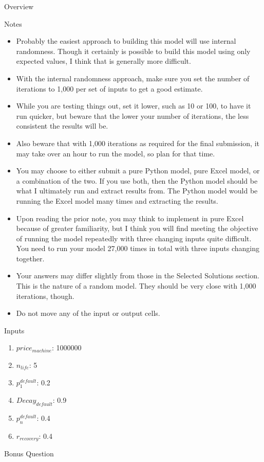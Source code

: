 \documentclass[]{article}
\begin{document}
\begin{section}{Overview}
\begin{subsection}{Notes}
\begin{itemize}
\item Probably the easiest approach to building this model will use internal randomness. Though it certainly is possible to build this model using only expected values, I think that is generally more difficult.
\item With the internal randomness approach, make sure you set the number of iterations to 1,000 per set of inputs to get a good estimate. 
\item While you are testing things out, set it lower, such as 10 or 100, to have it run quicker, but beware that the lower your number of iterations, the less consistent the results will be.
\item Also beware that with 1,000 iterations as required for the final submission, it may take over an hour to run the model, so plan for that time.
\item You may choose to either submit a pure Python model, pure Excel model, or a combination of the two. If you use both, then the Python model should be what I ultimately run and extract results from. The Python model would be running the Excel model many times and extracting the results.
\item Upon reading the prior note, you may think to implement in pure Excel because of greater familiarity, but I think you will find meeting the objective of running the model repeatedly with three changing inputs quite difficult. You need to run your model 27,000 times in total with three inputs changing together.
\item Your answers may differ slightly from those in the Selected Solutions section. This is the nature of a random model. They should be very close with 1,000 iterations, though.
\item Do not move any of the input or output cells. 
\end{itemize}
\end{subsection}
\begin{subsection}{Inputs}
\begin{enumerate}
\item $price_{machine}$: 1000000
\item $n_{life}$: 5
\item $p_1^{default}$: 0.2
\item $Decay_{default}$: 0.9
\item $p_n^{default}$: 0.4
\item $r_{recovery}$: 0.4
\end{enumerate}
\end{subsection}
\begin{subsection}{Bonus Question}


\end{subsection}
\end{section}
\end{document}
